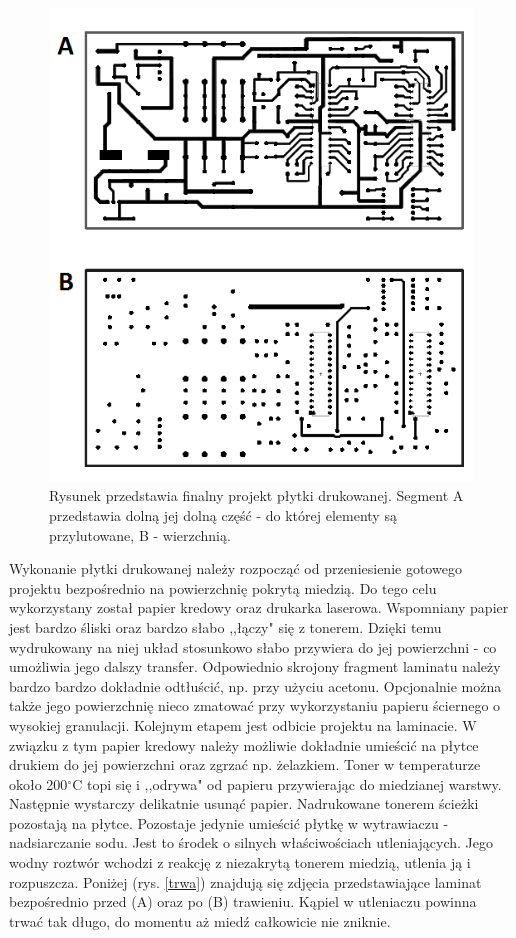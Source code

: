    \begin{figure}[H]
    \begin{center}
      \includegraphics[scale=0.85]{imgs/plytka.png}
 	\caption[Projekt płytki drukowanej.]{\small{Rysunek przedstawia finalny projekt płytki drukowanej. Segment A przedstawia dolną jej dolną część - do której elementy są przylutowane, B - wierzchnią. }}
	\label{plyta}
    \end{center}
  \end{figure}   
Wykonanie płytki drukowanej należy rozpocząć od przeniesienie gotowego projektu bezpośrednio na powierzchnię pokrytą miedzią. Do tego celu wykorzystany został papier kredowy oraz drukarka laserowa. Wspomniany papier jest bardzo śliski oraz bardzo słabo ,,łączy" się z tonerem. Dzięki temu wydrukowany na niej układ stosunkowo słabo przywiera do jej powierzchni - co umożliwia jego dalszy transfer. Odpowiednio skrojony fragment laminatu należy bardzo bardzo dokładnie odtłuścić, np. przy użyciu acetonu. Opcjonalnie można także jego powierzchnię nieco zmatować przy wykorzystaniu papieru ściernego o wysokiej granulacji. Kolejnym etapem jest odbicie projektu na laminacie. W związku z tym papier kredowy należy możliwie dokładnie umieścić na płytce drukiem do jej powierzchni oraz zgrzać np. żelazkiem. Toner w temperaturze około 200$^\circ$C topi się i ,,odrywa" od papieru przywierając do miedzianej warstwy. Następnie wystarczy delikatnie usunąć papier. Nadrukowane tonerem ścieżki pozostają na płytce. Pozostaje jedynie umieścić płytkę w wytrawiaczu - nadsiarczanie sodu. Jest to środek o silnych właściwościach utleniających. Jego wodny roztwór wchodzi z reakcję z niezakrytą tonerem miedzią, utlenia ją i rozpuszcza.  Poniżej (rys. \ref{trwa}) znajdują się zdjęcia przedstawiające laminat bezpośrednio przed (A) oraz po (B) trawieniu. Kąpiel w utleniaczu powinna trwać tak długo, do momentu aż miedź całkowicie nie zniknie.

